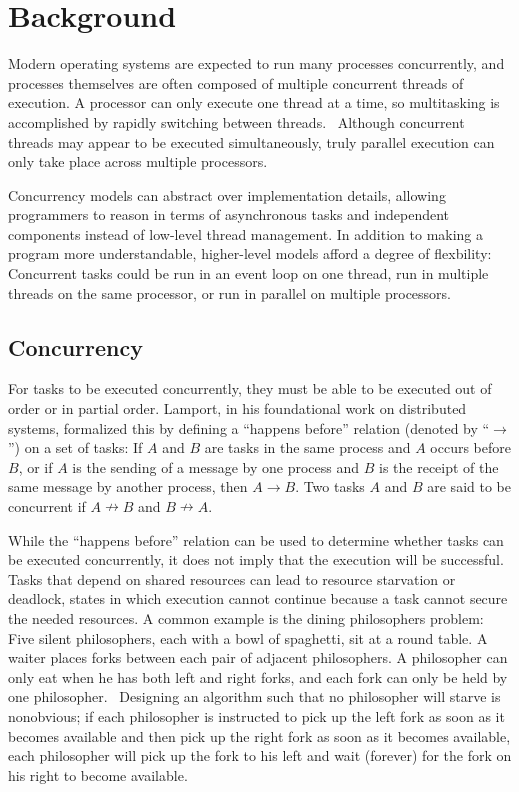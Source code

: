\documentclass{sig-alternate}
\begin{document}
\section{Background}

Modern operating systems are expected to run many processes concurrently, and processes themselves are often composed of multiple concurrent threads of execution. A processor can only execute one thread at a time, so multitasking is accomplished by rapidly switching between threads.~\cite{Liu1973} Although concurrent threads may appear to be executed simultaneously, truly parallel execution can only take place across multiple processors.

Concurrency models can abstract over implementation details, allowing programmers to reason in terms of asynchronous tasks and independent components instead of low-level thread management. In addition to making a program more understandable, higher-level models afford a degree of flexbility: Concurrent tasks could be run in an event loop on one thread, run in multiple threads on the same processor, or run in parallel on multiple processors.

\subsection{Concurrency}

For tasks to be executed concurrently, they must be able to be executed out of order or in partial order. Lamport, in his foundational work on distributed systems, formalized this by defining a ``happens before'' relation (denoted by ``$\rightarrow$'') on a set of tasks: If $A$ and $B$ are tasks in the same process and $A$ occurs before $B$, or if $A$ is the sending of a message by one process and $B$ is the receipt of the same message by another process, then $A \rightarrow B$. Two tasks $A$ and $B$ are said to be concurrent if $A \nrightarrow B$ and $B \nrightarrow A$.~\cite{Lamport1978}

While the ``happens before'' relation can be used to determine whether tasks can be executed concurrently, it does not imply that the execution will be successful. Tasks that depend on shared resources can lead to resource starvation or deadlock, states in which execution cannot continue because a task cannot secure the needed resources. A common example is the dining philosophers problem: Five silent philosophers, each with a bowl of spaghetti, sit at a round table. A waiter places forks between each pair of adjacent philosophers. A philosopher can only eat when he has both left and right forks, and each fork can only be held by one philosopher.~\cite{Hoare1978} Designing an algorithm such that no philosopher will starve is nonobvious; if each philosopher is instructed to pick up the left fork as soon as it becomes available and then pick up the right fork as soon as it becomes available, each philosopher will pick up the fork to his left and wait (forever) for the fork on his right to become available.
\end{document}
